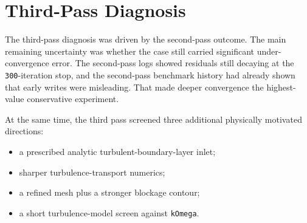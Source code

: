 \documentclass[11pt]{article}
\begin{document}
\section{Third-Pass Diagnosis}
The third-pass diagnosis was driven by the second-pass outcome. The main remaining uncertainty was whether the case still carried significant under-convergence error. The second-pass logs showed residuals still decaying at the \texttt{300}-iteration stop, and the second-pass benchmark history had already shown that early writes were misleading. That made deeper convergence the highest-value conservative experiment.

At the same time, the third pass screened three additional physically motivated directions:
\begin{itemize}
\item a prescribed analytic turbulent-boundary-layer inlet;
\item sharper turbulence-transport numerics;
\item a refined mesh plus a stronger blockage contour;
\item a short turbulence-model screen against \texttt{kOmega}.
\end{itemize}
\end{document}
